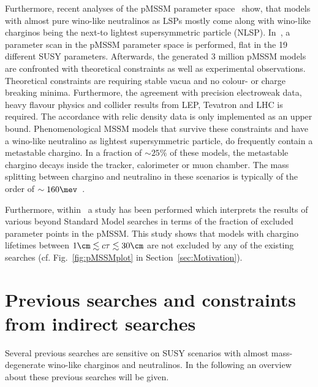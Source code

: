 Furthermore, recent analyses of the pMSSM parameter space~\cite{bib:pMSSMScan_2013,bib:pMSSMScan_2012} show, that models with almost pure wino-like neutralinos as LSPs mostly come along with wino-like charginos being the next-to lightest supersymmetric particle (NLSP).
In~\cite{bib:pMSSMScan_2013}, a parameter scan in the pMSSM parameter space is performed, flat in the 19 different SUSY parameters.
Afterwards, the generated 3 million pMSSM models are confronted with theoretical constraints as well as experimental observations.
Theoretical constraints are \eg requiring stable vacua and no colour- or charge breaking minima.
Furthermore, the agreement with precision electroweak data, heavy flavour physics and collider results from LEP, Tevatron and LHC is required.
The accordance with relic density data is only implemented as an upper bound.
Phenomenological MSSM models that survive these constraints and have a wino-like neutralino as lightest supersymmetric particle, do frequently contain  a metastable chargino.
In a fraction of $\sim 25\%$ of these models, the metastable chargino decays inside the tracker, calorimeter or muon chamber.
The mass splitting between chargino and neutralino in these scenarios is typically of the order of $\sim160\mev$~\cite{bib:pMSSMScan_2013}.

Furthermore, within~\cite{bib:CMS:DT_8TeV} a study has been performed which interprets the results of various beyond Standard Model searches in terms of the fraction of excluded parameter points in the pMSSM.
This study shows that models with chargino lifetimes between $1\cm \lesssim c\tau \lesssim 30\cm$ are not excluded by any of the existing searches (cf. Fig.~\ref{fig:pMSSMplot} in Section~\ref{sec:Motivation}).



\section{Previous searches and constraints from indirect searches}

Several previous searches are sensitive on SUSY scenarios with almost mass-degenerate wino-like charginos and neutralinos.
In the following an overview about these previous searches will be given.


